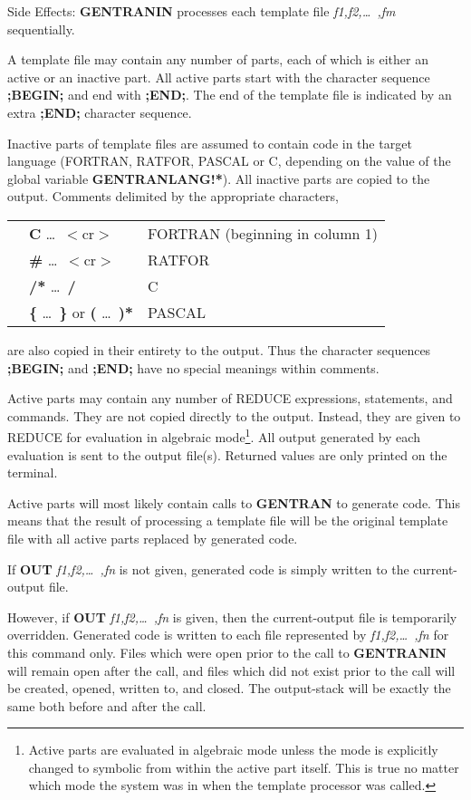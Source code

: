 \begin{describe}{Side Effects:}
{\bf GENTRANIN} processes each template file {\it f1,f2,\dots\ ,fm}
sequentially.

A template file may contain any number of parts, each of which
is either an active or an inactive part.  All active parts start with
the character sequence {\bf ;BEGIN;} and end with {\bf ;END;}.  The end
of the template file is indicated by an extra {\bf ;END;} character
sequence.   

Inactive parts of template files are assumed to contain code in the
target language (FORTRAN, RATFOR, PASCAL or C, depending on the value
of the global variable {\bf GENTRANLANG!*}).  All inactive parts are
copied to the output.  Comments delimited by the appropriate characters,
\begin{center}
\begin{tabular}{lll}
&{\bf C} \dots\  $<$cr$>$ & FORTRAN (beginning in column 1)\\
&{\bf \#} \dots\  $<$cr$>$ & RATFOR \\
&{\bf /*} \dots\  {\bf */} & C \\
&{\bf \{} \dots\ {\bf \}} or {\bf *(} \dots\  {\bf )*} & PASCAL\\
\end{tabular}
\end{center}
are also copied in their entirety to the output.  Thus the character
sequences {\bf ;BEGIN;} and {\bf ;END;} have no special meanings
within comments.

Active parts may contain any number of REDUCE expressions, statements,
and commands.  They are not copied directly to the output.  Instead,
they are given to REDUCE for evaluation in algebraic mode\footnote{
Active parts are evaluated in algebraic mode unless the mode is
explicitly changed to symbolic from within the active part itself.
This is true no matter which mode the system was in when the template
processor was called.}.  All output generated by each evaluation is
sent to the output file(s).  Returned values are only printed on the
terminal.

Active parts will most likely contain calls to {\bf GENTRAN} to
generate code.  This means that the result of processing a
template file will be the original template file with all active
parts replaced by generated code.

If {\bf OUT} {\it f1,f2,\dots\ ,fn} is not given, generated code is simply
written to the current-output file.

However, if {\bf OUT} {\it  f1,f2,\dots\ ,fn}
is given, then the current-output file
is temporarily overridden.  Generated code is written to each file represented
by {\it f1,f2,\dots\ ,fn} for this command only.  Files which were
open prior to the call to {\bf GENTRANIN} will remain open after the
call, and files which did not exist prior to the call will be
created, opened, written to, and closed.  The output-stack will be
exactly the same both before and after the call.
\end{describe}
